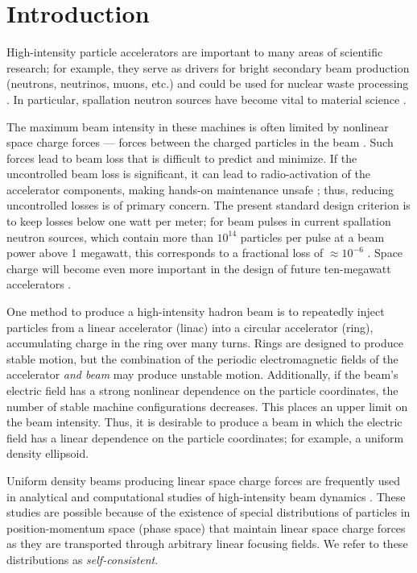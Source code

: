 \chapter{Introduction}\label{chap-1}

High-intensity particle accelerators are important to many areas of scientific research; for example, they serve as drivers for bright secondary beam production (neutrons, neutrinos, muons, etc.) \cite{Geer2009} and could be used for nuclear waste processing \cite{Yee-Rendon2021}. In particular, spallation neutron sources have become vital to material science \cite{Garoby2017}.

The maximum beam intensity in these machines is often limited by nonlinear space charge forces — forces between the charged particles in the beam \cite{Hofmann2017Book}. Such forces lead to beam loss that is difficult to predict and minimize. If the uncontrolled beam loss is significant, it can lead to radio-activation of the accelerator components, making hands-on maintenance unsafe \cite{Bungau2014}; thus, reducing uncontrolled losses is of primary concern. The present standard design criterion is to keep losses below one watt per meter; for beam pulses in current spallation neutron sources, which contain more than $10^{14}$ particles per pulse at a beam power above 1 megawatt, this corresponds to a fractional loss of $\approx 10^{-6}$ \cite{Henderson2014}. Space charge will become even more important in the design of future ten-megawatt accelerators \cite{Wei2014}. 
 
One method to produce a high-intensity hadron beam is to repeatedly inject particles from a linear accelerator (linac) into a circular accelerator (ring), accumulating charge in the ring over many turns. Rings are designed to produce stable motion, but the combination of the periodic electromagnetic fields of the accelerator \textit{and beam} may produce unstable motion. Additionally, if the beam's electric field has a strong nonlinear dependence on the particle coordinates, the number of stable machine configurations decreases. This places an upper limit on the beam intensity. Thus, it is desirable to produce a beam in which the electric field has a linear dependence on the particle coordinates; for example, a uniform density ellipsoid.

Uniform density beams producing linear space charge forces are frequently used in analytical and computational studies of high-intensity beam dynamics \cite{Lund2004}. These studies are possible because of the existence of special distributions of particles in position-momentum space (phase space) that maintain linear space charge forces as they are transported through arbitrary linear focusing fields. We refer to these distributions as \textit{self-consistent}.

